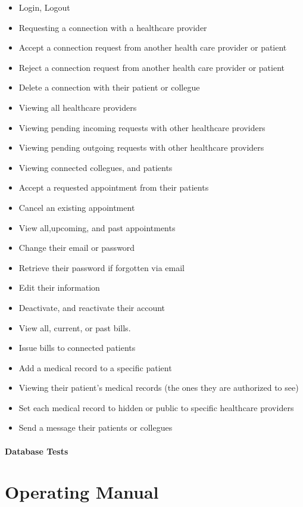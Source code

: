\documentclass[12pt]{report}
\begin{document}
\begin{itemize}
\item Login, Logout
\item Requesting a connection with a healthcare provider
\item Accept a connection request from another health care provider or patient
\item Reject a connection request from another health care provider or patient
\item Delete a connection with their patient or collegue
\item Viewing all healthcare providers
\item Viewing pending incoming requests with other healthcare providers
\item Viewing pending outgoing requests with other healthcare providers
\item Viewing connected collegues, and patients
\item Accept a requested appointment from their patients
\item Cancel an existing appointment
\item View all,upcoming, and past appointments
\item Change their email or password
\item Retrieve their password if forgotten via email
\item Edit their information
\item Deactivate, and reactivate their account
\item View all, current, or past bills.
\item Issue bills to connected patients
\item Add a medical record to a specific patient
\item Viewing their patient's medical records (the ones they are authorized to see)
\item Set each medical record to hidden or public to specific healthcare providers
\item Send a message their patients or collegues

\end{itemize}

\subsection{Database Tests}

\part{Operating Manual}
\end{document}
